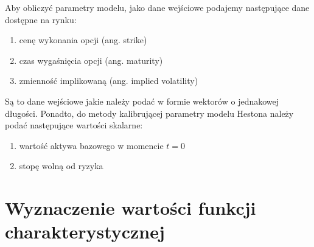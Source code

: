 \documentclass{pracamgr}
\begin{document}





Aby obliczyć parametry modelu, jako dane wejściowe podajemy następujące dane dostępne na rynku:
\begin{enumerate}
  \item cenę wykonania opcji (ang. strike)
  \item czas wygaśnięcia opcji (ang. maturity)
  \item zmienność implikowaną (ang. implied volatility)
\end{enumerate}
Są to dane wejściowe jakie należy podać w formie wektorów o jednakowej długości.
Ponadto, do metody kalibrującej parametry modelu Hestona należy podać następujące 
wartości skalarne:
\begin{enumerate}
  \item wartość aktywa bazowego w momencie $t=0$
  \item stopę wolną od ryzyka
\end{enumerate}

\section{Wyznaczenie wartości funkcji charakterystycznej} %
\label{sec:numeryczne_wyznaczenie_warto_ci_funkcji_charakterystycznej}
\end{document}
